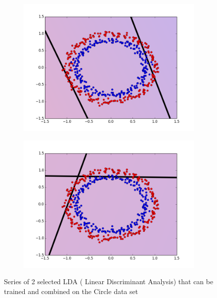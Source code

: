 \begin{figure}[H]
\medskip
\begin{subfigure}{0.48\textwidth}
\includegraphics[width=\linewidth]{figs/Circle/55-two-circle}
\caption{} \label{fig:Circle_all_single_e}
\end{subfigure}\hspace*{\fill}
\begin{subfigure}{0.48\textwidth}
\includegraphics[width=\linewidth]{figs/Circle/66-two-circle}
\caption{} \label{fig:Circle_all_single_f}
\end{subfigure}

\caption{Series of 2 selected LDA ( Linear Discriminant Analysis) that can be trained and combined on the Circle data set} \label{fig:Circle_all_single}
\end{figure}

